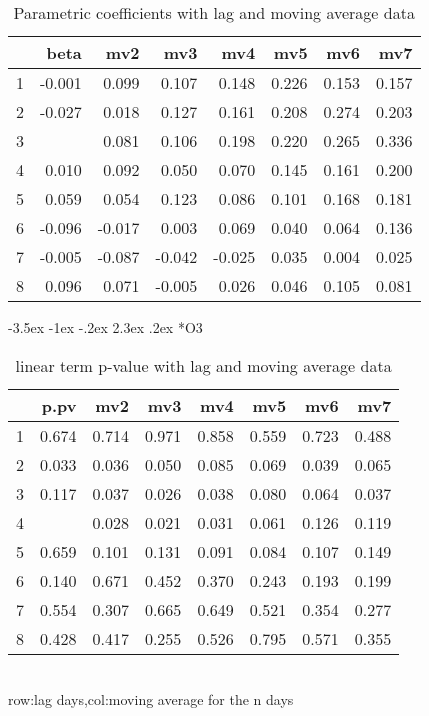 \documentclass[a4paper, 12pt]{article}
\makeatletter
\def\large{\fontsize{14}{20}\selectfont}
\renewcommand\subsection{\@startsection {subsection}{1}{\z@}%
                                   {-3.5ex \@plus -1ex \@minus -.2ex}%
                                   {2.3ex \@plus.2ex}%
                                   {\centering\normalfont\large\bfseries}}
\makeatother
\begin{document}
\begin{table}[h]
\centering
\caption{Parametric coefficients with lag and moving average data}
\begin{tabular}{rrrrrrrr}
  \hline
 & beta & mv2 & mv3 & mv4 & mv5 & mv6 & mv7 \\
  \hline
1 & -0.001 & 0.099 & 0.107 & 0.148 & 0.226 & 0.153 & 0.157 \\
  2 & -0.027 & 0.018 & 0.127 & 0.161 & 0.208 & 0.274 & 0.203 \\
  3 & \color{red}{0.139} & 0.081 & 0.106 & 0.198 & 0.220 & 0.265 & 0.336 \\
  4 & 0.010 & 0.092 & 0.050 & 0.070 & 0.145 & 0.161 & 0.200 \\
  5 & 0.059 & 0.054 & 0.123 & 0.086 & 0.101 & 0.168 & 0.181 \\
  6 & -0.096 & -0.017 & 0.003 & 0.069 & 0.040 & 0.064 & 0.136 \\
  7 & -0.005 & -0.087 & -0.042 & -0.025 & 0.035 & 0.004 & 0.025 \\
  8 & 0.096 & 0.071 & -0.005 & 0.026 & 0.046 & 0.105 & 0.081 \\
   \hline
\end{tabular}
\end{table}
\clearpage
\subsection*{O3}
\begin{table}[h]
\centering
\caption{linear term p-value with lag and moving average data}
\begin{tabular}{rrrrrrrr}
  \hline
 & p.pv & mv2 & mv3 & mv4 & mv5 & mv6 & mv7 \\
  \hline
1 & 0.674 & 0.714 & 0.971 & 0.858 & 0.559 & 0.723 & 0.488 \\
  2 & 0.033 & 0.036 & 0.050 & 0.085 & 0.069 & 0.039 & 0.065 \\
  3 & 0.117 & 0.037 & 0.026 & 0.038 & 0.080 & 0.064 & 0.037 \\
  4 & \color{red}{0.007} & 0.028 & 0.021 & 0.031 & 0.061 & 0.126 & 0.119 \\
  5 & 0.659 & 0.101 & 0.131 & 0.091 & 0.084 & 0.107 & 0.149 \\
  6 & 0.140 & 0.671 & 0.452 & 0.370 & 0.243 & 0.193 & 0.199 \\
  7 & 0.554 & 0.307 & 0.665 & 0.649 & 0.521 & 0.354 & 0.277 \\
  8 & 0.428 & 0.417 & 0.255 & 0.526 & 0.795 & 0.571 & 0.355 \\
   \hline
\end{tabular}
\\row:lag days,col:moving average for the n days
\end{table}
\end{document}
